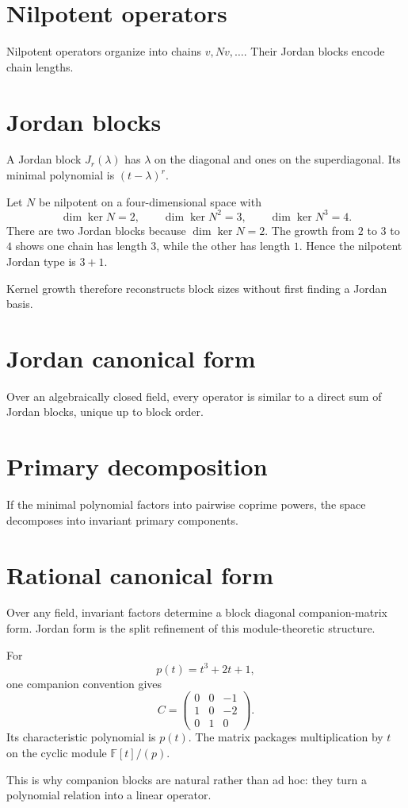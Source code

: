 \section{Nilpotent operators}
Nilpotent operators organize into chains $v,Nv,\ldots$. Their Jordan blocks encode chain lengths.

\section{Jordan blocks}
A Jordan block $J_r(\lambda)$ has $\lambda$ on the diagonal and ones on the superdiagonal. Its minimal polynomial is $(t-\lambda)^r$.


\begin{example}\label{ex:i12-expand-01}
Let \(N\) be nilpotent on a four-dimensional space with
\[
\dim\ker N=2,\qquad \dim\ker N^2=3,\qquad \dim\ker N^3=4.
\]
There are two Jordan blocks because \(\dim\ker N=2\). The growth from \(2\) to
\(3\) to \(4\) shows one chain has length \(3\), while the other has length
\(1\). Hence the nilpotent Jordan type is \(3+1\).

Kernel growth therefore reconstructs block sizes without first finding a
Jordan basis.
\end{example}
\section{Jordan canonical form}
Over an algebraically closed field, every operator is similar to a direct sum of Jordan blocks, unique up to block order.

\section{Primary decomposition}
If the minimal polynomial factors into pairwise coprime powers, the space decomposes into invariant primary components.

\section{Rational canonical form}
Over any field, invariant factors determine a block diagonal companion-matrix form. Jordan form is the split refinement of this module-theoretic structure.


\begin{example}\label{ex:i12-expand-02}
For
\[
p(t)=t^3+2t+1,
\]
one companion convention gives
\[
C=\begin{pmatrix}
0&0&-1\\
1&0&-2\\
0&1&0
\end{pmatrix}.
\]
Its characteristic polynomial is \(p(t)\). The matrix packages multiplication
by \(t\) on the cyclic module \(\mathbb F[t]/(p)\).

This is why companion blocks are natural rather than ad hoc: they turn a
polynomial relation into a linear operator.
\end{example}

